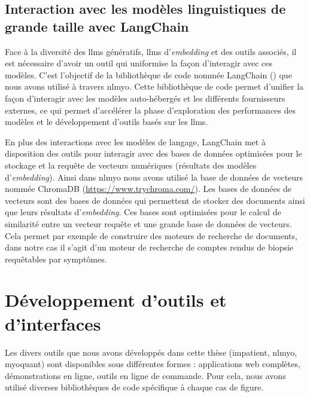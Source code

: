 \subsection{Interaction avec les modèles linguistiques de grande taille avec LangChain}

Face à la diversité des \gls{llms} génératifs, \gls{llms} d'\textit{embedding} et des outils associés, il est nécessaire d'avoir un outil qui uniformise la façon d'interagir avec ces modèles. C'est l'objectif de la bibliothèque de code nommée LangChain (\cite{chase_harrison_langchain_2022}) que nous avons utilisé à travers \gls{nlmyo}. Cette bibliothèque de code permet d'unifier la façon d'interagir avec les modèles auto-hébergés et les différents fournisseurs externes, ce qui permet d'accélérer la phase d'exploration des performances des modèles et le développement d'outils basés sur les \gls{llms}. 

En plus des interactions avec les modèles de langage, LangChain met à disposition des outils pour interagir avec des bases de données optimisées pour le stockage et la requête de vecteurs numériques (résultats des modèles d'\textit{embedding}). Ainsi dans \gls{nlmyo} nous avons utilisé la base de données de vecteurs nommée ChromaDB (\url{https://www.trychroma.com/}). Les bases de données de vecteurs sont des bases de données qui permettent de stocker des documents ainsi que leurs résultats d'\textit{embedding}. Ces bases sont optimisées pour le calcul de similarité entre un vecteur requête et une grande base de données de vecteurs. Cela permet par exemple de construire des moteurs de recherche de documents, dans notre cas il s'agit d'un moteur de recherche de comptes rendus de biopsie requêtables par symptômes.

\section{Développement d'outils et d'interfaces}
Les divers outils que nous avons développés dans cette thèse (\gls{impatient}, \gls{nlmyo}, \gls{myoquant}) sont disponibles sous différentes formes : applications web complètes, démonstrations en ligne, outils en ligne de commande. Pour cela, nous avons utilisé diverses bibliothèques de code spécifique à chaque cas de figure.


